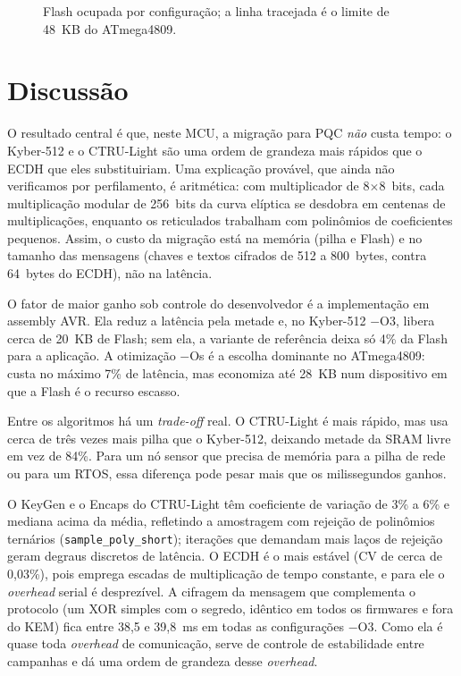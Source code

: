 \documentclass[acmsmall,nonacm,language=english,language=brazilian]{acmart}
\begin{document}
\begin{figure}[t]
  \centering
  
  \caption{Flash ocupada por configuração; a linha tracejada é o limite de
  48~KB do ATmega4809.}
  \label{fig:flash}
\end{figure}

\section{Discussão}
\label{sec:disc}
O resultado central é que, neste MCU, a migração para PQC \emph{não} custa
tempo: o Kyber-512 e o CTRU-Light são uma ordem de grandeza mais rápidos que o
ECDH que eles substituiriam. Uma explicação provável, que ainda não
verificamos por perfilamento, é aritmética: com multiplicador de 8$\times$8~bits,
cada multiplicação modular de 256~bits da curva elíptica se desdobra em
centenas de multiplicações, enquanto os reticulados trabalham com polinômios
de coeficientes pequenos. Assim, o custo da migração está na memória (pilha e
Flash) e no tamanho das mensagens (chaves e textos cifrados de 512 a
800~bytes, contra 64~bytes do ECDH), não na latência.

O fator de maior ganho sob controle do desenvolvedor é a implementação em
assembly AVR. Ela reduz a latência pela metade e, no Kyber-512 $-$O3, libera
cerca de 20~KB de Flash; sem ela, a variante de referência deixa só 4\% da
Flash para a aplicação. A otimização $-$Os é a escolha dominante no
ATmega4809: custa no máximo 7\% de latência, mas economiza até 28~KB num
dispositivo em que a Flash é o recurso escasso.

Entre os algoritmos há um \emph{trade-off} real. O CTRU-Light é mais rápido,
mas usa cerca de três vezes mais pilha que o Kyber-512, deixando metade da
SRAM livre em vez de 84\%. Para um nó sensor que precisa de memória para a
pilha de rede ou para um RTOS, essa diferença pode pesar mais que os
milissegundos ganhos.

O \textsf{KeyGen} e o \textsf{Encaps} do CTRU-Light têm coeficiente de
variação de 3\% a 6\% e mediana acima da média, refletindo a amostragem com
rejeição de polinômios ternários (\texttt{sample\_poly\_short}); iterações que
demandam mais laços de rejeição geram degraus discretos de latência. O ECDH é o
mais estável (CV de cerca de 0,03\%), pois emprega escadas de multiplicação de
tempo constante, e para ele o \emph{overhead} serial é desprezível. A cifragem da mensagem que complementa o protocolo
(um XOR simples com o segredo, idêntico em todos os firmwares e fora do KEM)
fica entre 38,5 e 39,8~ms em todas as configurações $-$O3. Como ela é quase
toda \emph{overhead} de comunicação, serve de controle de estabilidade entre
campanhas e dá uma ordem de grandeza desse \emph{overhead}.
\end{document}
